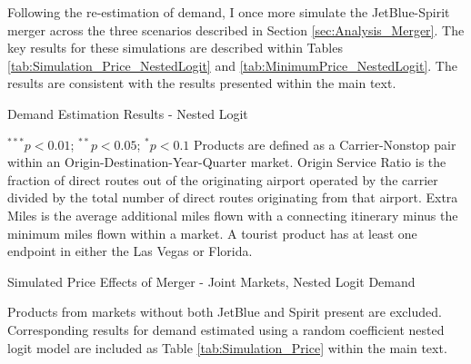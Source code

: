 \documentclass{article}
\begin{document}
\begin{appendices}
    Following the re-estimation of demand, I once more simulate the JetBlue-Spirit merger across the three scenarios described in Section \ref{sec:Analysis_Merger}. The key results for these simulations are described within Tables \ref{tab:Simulation_Price_NestedLogit} and \ref{tab:MinimumPrice_NestedLogit}. The results are consistent with the results presented within the main text.  

    \begin{table}
        \caption{Demand Estimation Results - Nested Logit}
        \label{tab:DemandEst_NestedLogit}
        \vspace{-15mm}
        \begin{center}
           
        \end{center}
        \vspace{-5mm}
                \footnotesize{$^{***}p<0.01$; $^{**}p<0.05$; $^{*}p<0.1$ Products are defined as a Carrier-Nonstop pair within an Origin-Destination-Year-Quarter market. Origin Service Ratio is the fraction of direct routes out of the originating airport operated by the carrier divided by the total number of direct routes originating from that airport. Extra Miles is the average additional miles flown with a connecting itinerary minus the minimum miles flown within a market.  A tourist product has at least one endpoint in either the Las Vegas or Florida.}
    \end{table}

      \begin{table}
        \caption{Simulated Price Effects of Merger - Joint Markets, Nested Logit Demand}
        \label{tab:Simulation_Price_NestedLogit}
                \vspace{-15mm}
        \begin{center}
         
        \end{center}
        \vspace{-5mm}
        \footnotesize{Products from markets without both JetBlue and Spirit present are excluded. Corresponding results for demand estimated using a random coefficient nested logit model are included as Table \ref{tab:Simulation_Price} within the main text.}

     \end{table}


\end{appendices}
\end{document}
